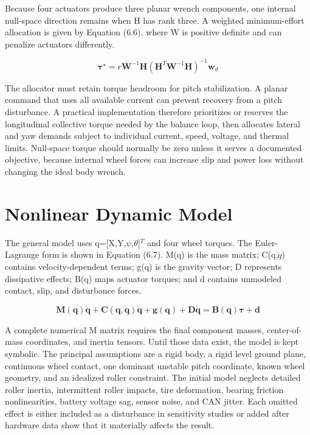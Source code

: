 Because four actuators produce three planar wrench components, one
internal null-space direction remains when H has rank three. A weighted
minimum-effort allocation is given by Equation (6.6), where W is
positive definite and can penalize actuators differently.

\begin{equation}
\boldsymbol{\tau}^{\star}=r\mathbf{W}^{-1}\mathbf{H}
\left(\mathbf{H}^{T}\mathbf{W}^{-1}\mathbf{H}\right)^{-1}\mathbf{w}_{d}
\label{eq:6-6}
\end{equation}

The allocator must retain torque headroom for pitch stabilization. A
planar command that uses all available current can prevent recovery from
a pitch disturbance. A practical implementation therefore prioritizes or
reserves the longitudinal collective torque needed by the balance loop,
then allocates lateral and yaw demands subject to individual current,
speed, voltage, and thermal limits. Null-space torque should normally be
zero unless it serves a documented objective, because internal wheel
forces can increase slip and power loss without changing the ideal body
wrench.

\section{Nonlinear Dynamic Model}\label{nonlinear-dynamic-model}

The general model uses q=[X,Y,\ensuremath{\psi},\ensuremath{\theta}]\ensuremath{^{T}} and four wheel torques. The
Euler-Lagrange form is shown in Equation (6.7). M(q) is the mass matrix;
C(q,\ensuremath{\dot{q}}) contains velocity-dependent terms; g(q) is the gravity vector; D
represents dissipative effects; B(q) maps actuator torques; and d
contains unmodeled contact, slip, and disturbance forces.

\begin{equation}
\mathbf{M}(\mathbf{q})\ddot{\mathbf{q}}+
\mathbf{C}(\mathbf{q},\dot{\mathbf{q}})\dot{\mathbf{q}}+
\mathbf{g}(\mathbf{q})+\mathbf{D}\dot{\mathbf{q}}
=\mathbf{B}(\mathbf{q})\boldsymbol{\tau}+\mathbf{d}
\label{eq:6-7}
\end{equation}

A complete numerical M matrix requires the final component masses,
center-of-mass coordinates, and inertia tensors. Until those data exist,
the model is kept symbolic. The principal assumptions are a rigid body,
a rigid level ground plane, continuous wheel contact, one dominant
unstable pitch coordinate, known wheel geometry, and an idealized roller
constraint. The initial model neglects detailed roller inertia,
intermittent roller impacts, tire deformation, bearing friction
nonlinearities, battery voltage sag, sensor noise, and CAN jitter. Each
omitted effect is either included as a disturbance in sensitivity
studies or added after hardware data show that it materially affects the
result.

